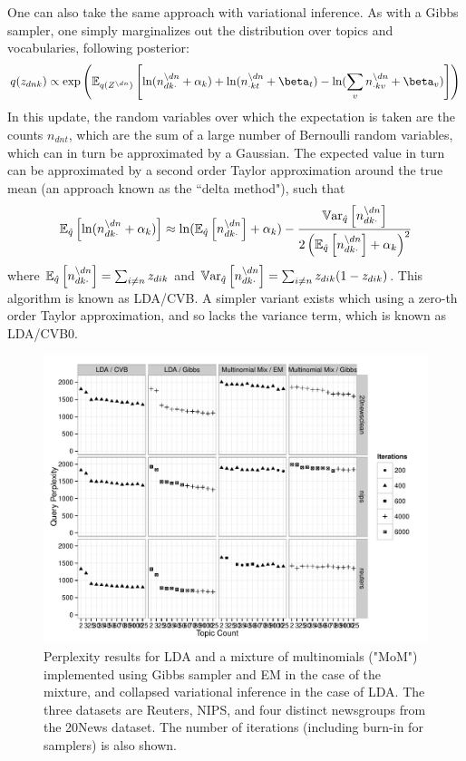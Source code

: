 One can also take the same approach with variational inference. As with a Gibbs sampler, one simply marginalizes out the distribution over topics and vocabularies, following posterior\cite{Teh2007}:
\begin{equation}
q(\zdnk) \propto \exp\left(\ex{
    \ln (n_{dk\cdot}^{\setminus dn} + \alpha_k ) 
    + \ln (n_{\cdot kt}^{\setminus dn} + \beta_t)
    - \ln (\sum_v n_{\cdot kv}^{\setminus dn} + \beta_v)}{q(Z^{\setminus dn})}
\right)
\end{equation}
In this update, the random variables over which the expectation is taken are the counts $n_{dnt}$, which are the sum of a large number of Bernoulli random variables, which can in turn be approximated by a Gaussian. The expected value in turn can be approximated by a second order Taylor approximation around the true mean (an approach known as the ``delta method"\cite{Wang2013}), such that
\begin{align}
\ex{\ln (n_{dk\cdot}^{\setminus dn} + \alpha_k )}{\hat{q}} 
\approx 
\ln (\ex{n_{dk\cdot}^{\setminus dn}}{\hat{q}} + \alpha_k ) - \frac{\var{n_{dk\cdot}^{\setminus dn}}{\hat{q}}}{2\left( \ex{n_{dk\cdot}^{\setminus dn}}{\hat{q}} + \alpha_k \right)^2}
\end{align}
where $\ex{n_{dk\cdot}^{\setminus dn}}{\hat{q}} = \sum_{i \neq n} z_{dik}$ and $\var{n_{dk\cdot}^{\setminus dn}}{\hat{q}} = \sum_{i \neq n} z_{dik}(1 - z_{dik})$. This algorithm is known as LDA/CVB. A simpler variant exists which using a zero-th order Taylor approximation, and so lacks the variance term, which is known as LDA/CVB0.\cite{Asuncion2012} 


\begin{figure}
  \centering
    \includegraphics[width=\textwidth]{plots/results-2013-03-18-bw.pdf}
  \caption{Perplexity results for LDA and a mixture of multinomials ("MoM") implemented using Gibbs sampler and EM in the case of the mixture, and collapsed variational inference in the case of LDA. The three datasets are Reuters, NIPS, and four distinct newsgroups from the 20News dataset. The number of iterations (including burn-in for samplers) is also shown.}
  \label{fig:nip-reuters-20news-tests}
\end{figure}


